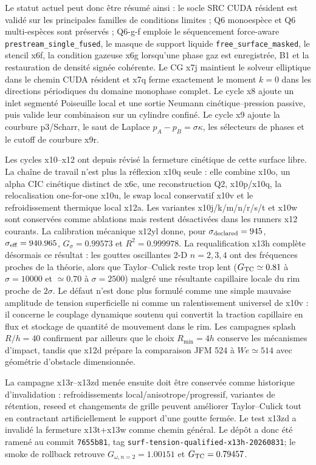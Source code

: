 \documentclass[11pt,a4paper]{article}
\begin{document}
Le statut actuel peut donc être résumé ainsi : le socle SRC CUDA résident est validé sur les principales familles de conditions limites ; Q6 monoespèce et Q6 multi-espèces sont préservés ; Q6-g-f emploie le séquencement force-aware \texttt{prestream\_single\_fused}, le masque de support liquide \texttt{free\_surface\_masked}, le stencil x6f, la condition gazeuse x6g lorsqu'une phase gaz est enregistrée, B1 et la restauration de densité signée cohérente. Le CG x7j maintient le solveur elliptique dans le chemin CUDA résident et x7q ferme exactement le moment $k=0$ dans les directions périodiques du domaine monophase complet. Le cycle x8 ajoute un inlet segmenté Poiseuille local et une sortie Neumann cinétique--pression passive, puis valide leur combinaison sur un cylindre confiné. Le cycle x9 ajoute la courbure p3/Scharr, le saut de Laplace $p_A-p_B=\sigma\kappa$, les sélecteurs de phases et le cutoff de courbure x9r.

Les cycles x10--x12 ont depuis révisé la fermeture cinétique de cette surface libre. La chaîne de travail n'est plus la réflexion x10q seule : elle combine x10o, un alpha CIC cinétique distinct de x6c, une reconstruction Q2, x10p/x10q, la relocalisation one-for-one x10u, le swap local conservatif x10v et le refroidissement thermique local x12a. Les variantes x10j/k/m/n/r/s/t et x10w sont conservées comme ablations mais restent désactivées dans les runners x12 courants. La calibration mécanique x12yl donne, pour $\sigma_{\rm declared}=945$, $\sigma_{\rm eff}=940.965$, $G_\sigma=0.99573$ et $R^2=0.999978$. La requalification x13h complète désormais ce résultat : les gouttes oscillantes 2-D $n=2,3,4$ ont des fréquences proches de la théorie, alors que Taylor--Culick reste trop lent ($G_{\rm TC}\simeq0.81$ à $\sigma=10000$ et $\simeq0.70$ à $\sigma=2500$) malgré une résultante capillaire locale du rim proche de $2\sigma$. Le défaut n'est donc plus formulé comme une simple mauvaise amplitude de tension superficielle ni comme un ralentissement universel de x10v : il concerne le couplage dynamique soutenu qui convertit la traction capillaire en flux et stockage de quantité de mouvement dans le rim. Les campagnes splash $R/h=40$ confirment par ailleurs que le choix $R_{\min}=4h$ conserve les mécanismes d'impact, tandis que x12d prépare la comparaison JFM 524 à $We\simeq514$ avec géométrie d'obstacle dimensionnée.

La campagne x13r--x13zd menée ensuite doit être conservée comme historique d'invalidation : refroidissements local/anisotrope/progressif, variantes de rétention, reseed et changements de grille peuvent améliorer Taylor--Culick tout en contractant artificiellement le support d'une goutte fermée. Le test x13zd a invalidé la fermeture x13t+x13w comme chemin général. Le dépôt a donc été ramené au commit \texttt{7655b81}, tag \texttt{surf-tension-qualified-x13h-20260831}; le smoke de rollback retrouve $G_{\omega,n=2}=1.00151$ et $G_{\rm TC}=0.79457$.
\end{document}
